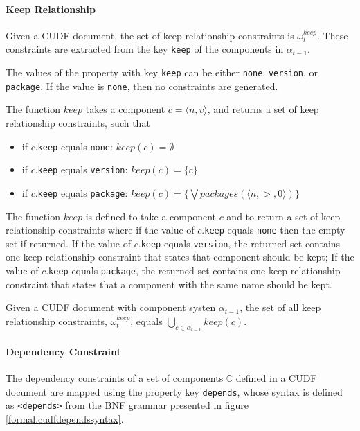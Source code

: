 \paragraph{Keep Relationship}
Given a CUDF document, the set of keep relationship constraints is $\omega_t^{keep}$.
These constraints are extracted from the key \texttt{keep} of the components in $\alpha_{t-1}$.
 
The values of the property with key \texttt{keep} can be either \texttt{none}, \texttt{version}, or \texttt{package}.
If the value is \texttt{none}, then no constraints are generated.
\begin{defs}
The function $keep$ takes a component $c = \langle n ,v \rangle$, and returns a set of keep relationship constraints, such that
\begin{itemize}
	\item if $c$.\verb+keep+ equals \verb+none+: $keep(c) = \emptyset$
	\item if $c$.\verb+keep+ equals \verb+version+: $keep(c) = \{c\}$
	\item if $c$.\verb+keep+ equals \verb+package+: $keep(c) = \{\bigvee packages(\langle n, >, 0 \rangle)\}$
\end{itemize}
\end{defs}
The function $keep$ is defined to take a component $c$ and to return a set of keep relationship constraints where
if the value of $c$.\verb+keep+ equals \verb+none+ then the empty set if returned.
If the value of $c$.\verb+keep+ equals \verb+version+, the returned set contains one keep relationship constraint that states that component should be kept;
If the value of $c$.\verb+keep+ equals \verb+package+, 
the returned set contains one keep relationship constraint that states that a component with the same name should be kept. 

\begin{defs}
Given a CUDF document with component systen $\alpha_{t-1}$, the set of all keep relationship constraints, $\omega_t^{keep}$, 
equals $\bigcup \limits_{c \in \alpha_{t-1}} keep(c)$.
\end{defs}

\paragraph{Dependency Constraint}
The dependency constraints of a set of components $\mathbb{C}$ defined in a CUDF document are mapped using the property key \verb+depends+,
whose syntax is defined as \verb+<depends>+ from the BNF grammar presented in figure \ref{formal.cudfdependssyntax}.



